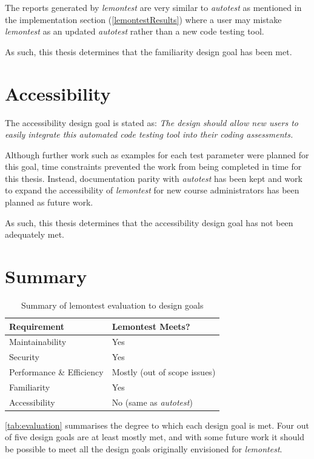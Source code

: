 \documentclass[hidelinks]{report}
\begin{document}
The reports generated by \textit{lemontest} are very similar to \textit{autotest} as mentioned in the implementation section (\autoref{lemontestResults}) where a user may mistake \textit{lemontest} as an updated \textit{autotest} rather than a new code testing tool.

As such, this thesis determines that the familiarity design goal has been met.

\section{Accessibility}
The accessibility design goal is stated as: \textit{The design should allow new users to easily integrate this automated code testing tool into their coding assessments.}

Although further work such as examples for each test parameter were planned for this goal, time constraints prevented the work from being completed in time for this thesis. Instead, documentation parity with \textit{autotest} has been kept and work to expand the accessibility of \textit{lemontest} for new course administrators has been planned as future work.

As such, this thesis determines that the accessibility design goal has not been adequately met.

\section{Summary}
\begin{table}[h]
	\centering
	\begin{tabular}{ll}
		\toprule
		\textbf{Requirement} & \textbf{Lemontest Meets?} \\
		\midrule
		Maintainability  & Yes \\
		Security 		 & Yes\\
		Performance \& Efficiency & Mostly (out of scope issues)\\
		Familiarity      & Yes \\
		Accessibility    & No (same as \textit{autotest}) \\
		\bottomrule
	\end{tabular}
	\caption{Summary of lemontest evaluation to design goals}
	\label{tab:evaluation}
\end{table}
\autoref{tab:evaluation} summarises the degree to which each design goal is met. Four out of five design goals are at least mostly met, and with some future work it should be possible to meet all the design goals originally envisioned for \textit{lemontest}.
\end{document}
